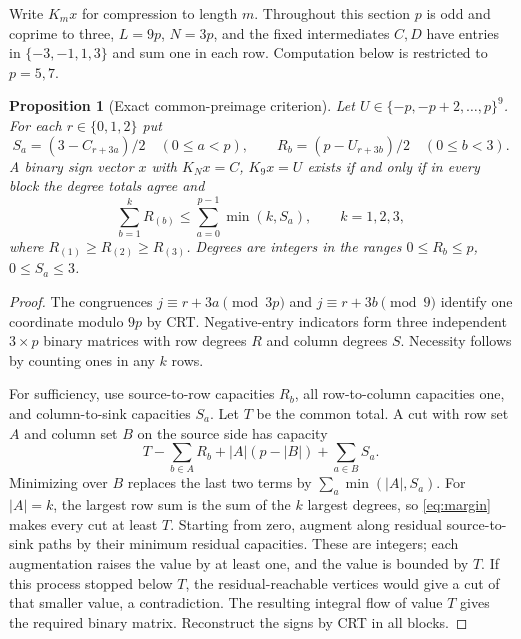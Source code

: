 \documentclass[11pt]{article}
\newtheorem{proposition}[theorem]{Proposition}
\begin{document}
Write $K_m x$ for compression to length $m$. Throughout this section $p$ is
odd and coprime to three, $L=9p$, $N=3p$, and the fixed intermediates $C,D$
have entries in $\{-3,-1,1,3\}$ and sum one in each row. Computation below
is restricted to $p=5,7$.

\begin{proposition}[Exact common-preimage criterion]\label{prop:margins}
Let $U\in\{-p,-p+2,\ldots,p\}^9$. For each $r\in\{0,1,2\}$ put
\[
 S_a=(3-C_{r+3a})/2\quad(0\leq a<p),\qquad
 R_b=(p-U_{r+3b})/2\quad(0\leq b<3).
\]
A binary sign vector $x$ with $K_Nx=C$, $K_9x=U$ exists if and only if
in every block the degree totals agree and
\begin{equation}\label{eq:margin}
 \sum_{b=1}^k R_{(b)}\leq\sum_{a=0}^{p-1}\min(k,S_a),\qquad k=1,2,3,
\end{equation}
where $R_{(1)}\geq R_{(2)}\geq R_{(3)}$. Degrees are integers in the
ranges $0\leq R_b\leq p$, $0\leq S_a\leq3$.
\end{proposition}
\begin{proof}
The congruences $j\equiv r+3a\pmod{3p}$ and
$j\equiv r+3b\pmod9$ identify one coordinate modulo $9p$ by CRT.
Negative-entry indicators form three independent $3\times p$ binary
matrices with row degrees $R$ and column degrees $S$. Necessity follows
by counting ones in any $k$ rows.

For sufficiency, use source-to-row capacities $R_b$, all row-to-column
capacities one, and column-to-sink capacities $S_a$. Let $T$ be the
common total. A cut with row set $A$ and column set $B$ on the source
side has capacity
\[
 T-\sum_{b\in A}R_b+|A|(p-|B|)+\sum_{a\in B}S_a.
\]
Minimizing over $B$ replaces the last two terms by
$\sum_a\min(|A|,S_a)$. For $|A|=k$, the largest row sum is the sum of
the $k$ largest degrees, so \eqref{eq:margin} makes every cut at least $T$.
Starting from zero, augment along residual source-to-sink paths by their
minimum residual capacities. These are integers; each augmentation raises
the value by at least one, and the value is bounded by $T$. If this process
stopped below $T$, the residual-reachable vertices would give a cut of that
smaller value, a contradiction. The resulting integral flow of value $T$
gives the required binary matrix. Reconstruct the signs by CRT in all blocks.
\end{proof}
\end{document}
